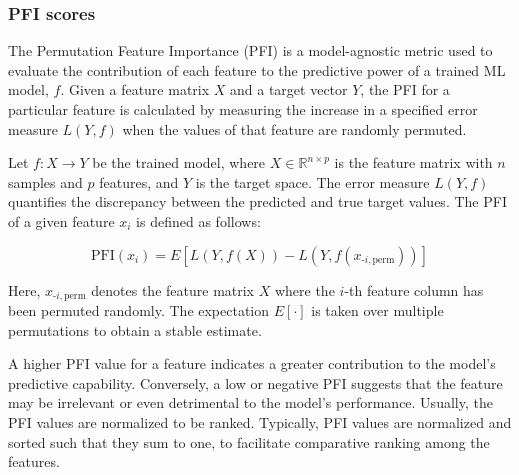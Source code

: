 \subsubsection{PFI scores}

The Permutation Feature Importance (\gls{PFI}) is a model-agnostic metric used to evaluate the contribution of each feature to the predictive power of a trained \gls{ML} model, \(f\). Given a feature matrix \(X\) and a target vector \(Y\), the \gls{PFI} for a particular feature is calculated by measuring the increase in a specified error measure \(L(Y, f)\) when the values of that feature are randomly permuted.

Let \(f: X \rightarrow Y\) be the trained model, where \(X \in \mathbb{R}^{n \times p}\) is the feature matrix with \(n\) samples and \(p\) features, and \(Y\) is the target space. The error measure \(L(Y, f)\) quantifies the discrepancy between the predicted and true target values. The \gls{PFI} of a given feature \(x_i\) is defined as follows:

\begin{equation}
\text{PFI}(x_i) = E\left[ L(Y, f(X)) - L\left(Y, f(x_{\text{-}i, \text{perm}})\right) \right]
\end{equation}

Here, \(x_{\text{-}i, \text{perm}}\) denotes the feature matrix \(X\) where the \(i\)-th feature column has been permuted randomly. The expectation \(E[\cdot]\) is taken over multiple permutations to obtain a stable estimate.

A higher \gls{PFI} value for a feature indicates a greater contribution to the model's predictive capability. Conversely, a low or negative \gls{PFI} suggests that the feature may be irrelevant or even detrimental to the model's performance. Usually, the \gls{PFI} values are normalized to be ranked. Typically, \gls{PFI} values are normalized and sorted such that they sum to one, to facilitate comparative ranking among the features. 

